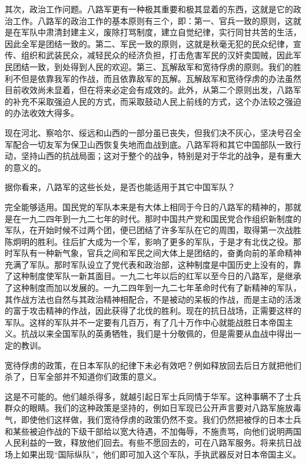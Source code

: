 其次，政治工作问题。八路军更有一种极其重要和极其显着的东西，这就是它的政治工作。八路军的政治工作的基本原则有三个，即：第一、官兵一致的原则，这就是在军队中肃清封建主义，废除打骂制度，建立自觉纪律，实行同甘共苦的生活，因此全军是团结一致的。第二、军民一致的原则，这就是秋毫无犯的民众纪律，宣传、组织和武装民众，减轻民众的经济负担，打击危害军民的汉奸卖国贼，因此军民团结一致，到处得到人民的欢迎。第三、瓦解敌军和宽待俘虏的原则。我们的胜利不但是依靠我军的作战，而且依靠敌军的瓦解。瓦解敌军和宽待俘虏的办法虽然目前收效尚未显着，但在将来必定会有成效的。此外，从第二个原则出发，八路军的补充不采取强迫人民的方式，而采取鼓动人民上前线的方式，这个办法较之强迫的办法收效大得多。

现在河北、察哈尔、绥远和山西的一部分虽已丧失，但我们决不灰心，坚决号召全军配合一切友军为保卫山西恢复失地而血战到底。八路军将和其它中国部队一致行动，坚持山西的抗战局面；这对于整个的战争，特别是对于华北的战争，是有重大的意义的。

据你看来，八路军的这些长处，是否也能适用于其它中国军队？

完全能够适用。国民党的军队本来是有大体上相同于今日的八路军的精神的，那就是在一九二四年到一九二七年的时代。那时中国共产党和国民党合作组织新制度的军队，在开始时候不过两个团，便已团结了许多军队在它的周围，取得第一次战胜陈炯明的胜利。往后扩大成为一个军，影响了更多的军队，于是才有北伐之役。那时军队有一种新气象，官兵之间和军民之间大体上是团结的，奋勇向前的革命精神充满了军队。那时军队设立了党代表和政治部，这种制度是中国历史上没有的，靠了这种制度使军队一新其面目。一九二七年以后的红军以至今日的八路军，是继承了这种制度而加以发展的。一九二四年到一九二七年革命时代有了新精神的军队，其作战方法也自然与其政治精神相配合，不是被动的呆板的作战，而是主动的活泼的富于攻击精神的作战，因此获得了北伐的胜利。现在的抗日战场，正需要这样的军队。这样的军队并不一定要有几百万，有了几十万作中心就能战胜日本帝国主义。抗战以来全国军队的英勇牺牲，我们是十分敬佩的，但是需要从血战中得出一定的教训。

宽待俘虏的政策，在日本军队的纪律下未必有效吧？例如释放回去后日方就把他们杀了，日军全部并不知道你们政策的意义。

这是不可能的。他们越杀得多，就越引起日军士兵同情于华军。这种事瞒不了士兵群众的眼睛。我们的这种政策是坚持的，例如日军现已公开声言要对八路军施放毒气，即使他们这样做，我们宽待俘虏的政策仍然不变。我们仍然把被俘的日本士兵和某些被迫作战的下级干部给以宽大待遇，不加侮辱，不施责骂，向他们说明两国人民利益的一致，释放他们回去。有些不愿回去的，可在八路军服务。将来抗日战场上如果出现“国际纵队”，他们即可加入这个军队，手执武器反对日本帝国主义。

